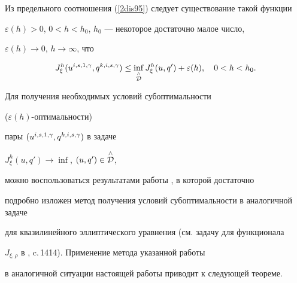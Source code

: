 Из предельного соотношения (\ref{2dis95}) следует существование такой функции


$\varepsilon(h)>0$, $0<h<h_0$, $h_0$ --- некоторое достаточно малое число,


$\varepsilon(h)\to 0$, $h\to\infty$, что


$$




J_\xi^h(u^{i,s,1,\gamma},q^{k,i,s,\gamma})\leq


\inf_{\up{\wedge}{\cal D}}J_\xi^h(u,


q')+\varepsilon(h),\quad 0<h<h_0.




$$





Для получения необходимых условий субоптимальности


($\varepsilon(h)$-оптимальности)


пары $(u^{i,s,1,\gamma},\linebreak q^{k,i,s,\gamma})$ в задаче


$J_\xi^h(u,q')\to\inf$, $(u,q')\in\overset{\wedge}{\cal D}{}$,


можно воспользоваться результатами работы \cite{sumin89}, в которой достаточно


подробно изложен метод получения условий субоптимальности в аналогичной задаче


для квазилинейного эллиптического уравнения (см. задачу для функционала


$J_{\xi,\rho}$ в \cite{sumin89}, c.\,1414). Применение метода указанной работы


в аналогичной ситуации настоящей работы приводит к следующей теореме.





